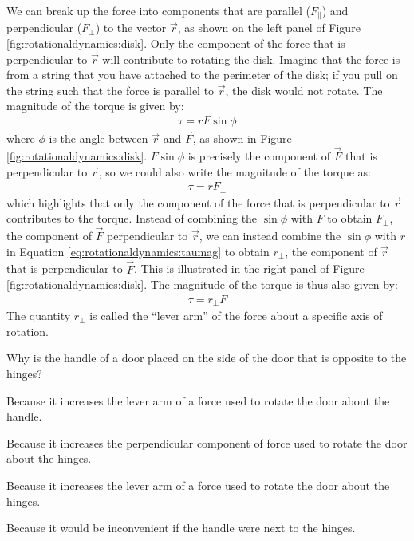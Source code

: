 We can break up the force into components that are parallel ($F_\parallel$) and perpendicular ($F_\perp$) to the vector $\vec r$, as shown on the left panel of Figure \ref{fig:rotationaldynamics:disk}. Only the component of the force that is perpendicular to $\vec r$ will contribute to rotating the disk. Imagine that the force is from a string that you have attached to the perimeter of the disk; if you pull on the string such that the force is parallel to $\vec r$, the disk would not rotate. The magnitude of the torque is given by:
\begin{align}
\label{eq:rotationaldynamics:taumag}
\tau = rF\sin\phi
\end{align}
where $\phi$ is the angle between $\vec r$ and $\vec F$, as shown in Figure \ref{fig:rotationaldynamics:disk}. $F \sin \phi$ is precisely the component of $\vec F$ that is perpendicular to $\vec r$, so we could also write the magnitude of the torque as:
\begin{align*}
\tau =rF_\perp
\end{align*}
which highlights that only the component of the force that is perpendicular to $\vec r$ contributes to the torque. Instead of combining the $\sin \phi$ with $F$ to obtain $F_\perp$, the component of $\vec F$ perpendicular to $\vec r$, we can instead combine the $\sin \phi$ with $r$ in Equation \ref{eq:rotationaldynamics:taumag} to obtain $r_\perp$, the component of $\vec r$ that is perpendicular to $\vec F$. This is illustrated in the right panel of Figure \ref{fig:rotationaldynamics:disk}. The magnitude of the torque is thus also given by:
\begin{align*}
\tau =r_\perp F
\end{align*}
The quantity $r_\perp$ is called the ``lever arm'' of the force about a specific axis of rotation. 

\begin{checkpoint}
\begin{MCquestion}{Why is the handle of a door placed on the side of the door that is opposite to the hinges?}
\item Because it increases the lever arm of a force used to rotate the door about the handle.
\item Because it increases the perpendicular component of force used to rotate the door about the hinges.
\item Because it increases the lever arm of a force used to rotate the door about the hinges. \correct
\item Because it would be inconvenient if the handle were next to the hinges.
\end{MCquestion}
\end{checkpoint}

